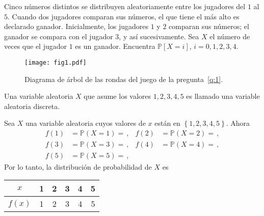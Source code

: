 \question\label{q:1}%
	Cinco números distintos se distribuyen aleatoriamente entre los jugadores del $1$ al $5$. Cuando dos jugadores comparan sus números, el que tiene el más alto es declarado ganador. Inicialmente, los jugadores $1$ y $2$ comparan sus números; el ganador se compara con el jugador $3$, y así sucesivamente. Sea $X$ el número de veces que el jugador $1$ es un ganador. Encuentra $\mathds{P}[X = i]$, $i = 0, 1, 2, 3, 4$.

	\ifprintanswers
	\begin{figure}[!ht]
		\centering
		\texttt{[image: fig1.pdf]}
		\caption{Diagrama de árbol de las rondas del juego de la pregunta~\ref{q:1}.}
		\label{fig:1}
	\end{figure}
	\fi
	
	\begin{solutionorbox}
		Una variable aleatoria $X$ que asume los valores $1,2,3,4,5$ es llamado una variable aleatoria discreta.

		Sea $X$ una variable aleatoria cuyos valores de $x$ están en $\left\{1,2,3,4,5\right\}$. Ahora
		\begin{align*}
			f(1) &= \mathds{P}\left(X=1\right)=\frac{}{}, & 	f(2) &= \mathds{P}\left(X=2\right)=\frac{}{}, \\
			f(3) &= \mathds{P}\left(X=3\right)=\frac{}{}, & 	f(4) &= \mathds{P}\left(X=4\right)=\frac{}{}, \\
			f(5) &= \mathds{P}\left(X=5\right)=\frac{}{}, & 	&
		\end{align*}
		Por lo tanto, la distribución de probabilidad de $X$ es	
		\centering
		\begin{tabular}{c|ccccc}
			$x$ 	& 1 & 2 & 3 & 4 & 5 \\
			\hline
			$f(x)$& 1 & 2 & 3 & 4 & 5
		\end{tabular}
	\end{solutionorbox}